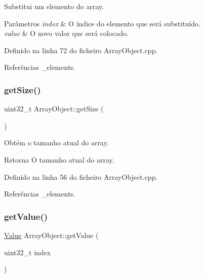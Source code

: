 Substitui um elemento do array. 


\begin{DoxyParams}{Parâmetros}
{\em index} & O índice do elemento que será substituído. \\
\hline
{\em value} & O novo valor que será colocado. \\
\hline
\end{DoxyParams}


Definido na linha 72 do ficheiro Array\+Object.\+cpp.



Referências \+\_\+elements.

\mbox{\label{classArrayObject_af43b8f4106c2f15def7fecd3e3f6b239}} 
\subsubsection{\texorpdfstring{get\+Size()}{getSize()}}
{\footnotesize\ttfamily uint32\+\_\+t Array\+Object\+::get\+Size (\begin{DoxyParamCaption}{ }\end{DoxyParamCaption})}



Obtém o tamanho atual do array. 

\begin{DoxyReturn}{Retorna}
O tamanho atual do array. 
\end{DoxyReturn}


Definido na linha 56 do ficheiro Array\+Object.\+cpp.



Referências \+\_\+elements.

\mbox{\label{classArrayObject_a468341ed2c683c3152a0ea58b2094c0f}} 
\subsubsection{\texorpdfstring{get\+Value()}{getValue()}}
{\footnotesize\ttfamily \hyperlink{structValue}{Value} Array\+Object\+::get\+Value (\begin{DoxyParamCaption}\item[{uint32\+\_\+t}]{index }\end{DoxyParamCaption})}



